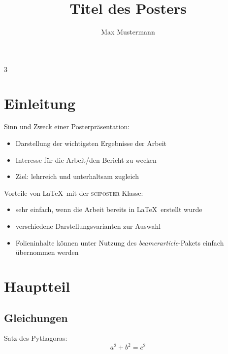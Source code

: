\documentclass[portrait,20pt]{sciposter}
\title{Titel des Posters}
\author{Max Mustermann}
\institute{Institut für Medizintechnik \\
	Otto-von-Guericke-Universität, Magdeburg}
\begin{document}

\maketitle\vspace{-1em}

\begin{multicols}{3}

\section{Einleitung}

\begin{block}{Sinn und Zweck einer Posterpräsentation:}
	\begin{itemize}
		\item Darstellung der wichtigsten Ergebnisse der Arbeit
		\item Interesse für die Arbeit/den Bericht zu wecken
		\item Ziel: lehrreich und unterhaltsam zugleich
	\end{itemize}
\end{block}

\begin{block}{Vorteile von \LaTeX\ mit der \textsc{sciposter}-Klasse:}
	\begin{itemize}
		\item sehr einfach, wenn die Arbeit bereits in \LaTeX\ erstellt wurde
		\item verschiedene Darstellungsvarianten zur Auswahl
		\item Folieninhalte können unter Nutzung des \emph{beamerarticle}-Pakets einfach übernommen werden
	\end{itemize}
\end{block}

\section{Hauptteil}

\subsection{Gleichungen}

\begin{block}{Satz des Pythagoras:}
	\begin{equation}
		a^2 + b^2 = c^2 \label{eq:pythogoras}
	\end{equation}
\end{block}


\end{multicols}
\end{document}

